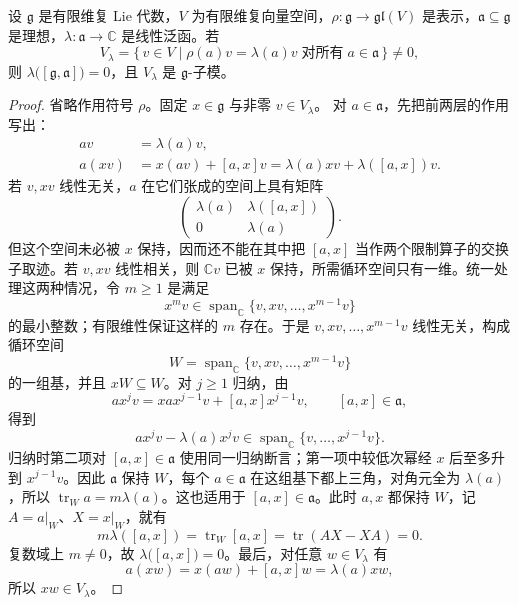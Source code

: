 \begin{lemma}[理想的特征空间]\label{b5:lem:ideal-weight-stable}
	设 \(\mathfrak g\) 是有限维复 Lie 代数，\(V\) 为有限维复向量空间，\(\rho:\mathfrak g\rightarrow\mathfrak{gl}(V)\) 是表示，\(\mathfrak a\subseteq\mathfrak g\) 是理想，\(\lambda:\mathfrak a\rightarrow\mathbb C\) 是线性泛函。若
	\[
		V_\lambda=\bigl\{\,v\in V\mid \rho(a)v=\lambda(a)v \;\text{对所有}\;a\in\mathfrak a\,\bigr\}\ne0,
	\]
	则 \(\lambda\bigl([\mathfrak g,\mathfrak a]\bigr)=0\)，且 \(V_\lambda\) 是 \(\mathfrak g\)-子模。
\end{lemma}
\begin{proof}
	省略作用符号 \(\rho\)。固定 \(x\in\mathfrak g\) 与非零 \(v\in V_\lambda\)。 对 \(a\in\mathfrak a\)，先把前两层的作用写出：
	\[
		\begin{aligned}
			av&=\lambda(a)v,\\
			a(xv)&=x(av)+[a,x]v =\lambda(a)xv+\lambda([a,x])v.
		\end{aligned}
	\]
	若 \(v,xv\) 线性无关，\(a\) 在它们张成的空间上具有矩阵
	\[
		\begin{pmatrix}
			\lambda(a)&\lambda([a,x])\\
			0&\lambda(a)
		\end{pmatrix}.
	\]
	但这个空间未必被 \(x\) 保持，因而还不能在其中把 \([a,x]\) 当作两个限制算子的交换子取迹。若 \(v,xv\) 线性相关，则 \(\mathbb Cv\) 已被 \(x\) 保持，所需循环空间只有一维。统一处理这两种情况，令 \(m\ge1\) 是满足
	\[
		x^mv\in\operatorname{span}_{\mathbb C}\{v,xv,\ldots,x^{m-1}v\}
	\]
	的最小整数；有限维性保证这样的 \(m\) 存在。于是 \(v,xv,\ldots,x^{m-1}v\) 线性无关，构成循环空间
	\[
		W=\operatorname{span}_{\mathbb C}\{v,xv,\ldots,x^{m-1}v\}
	\]
	的一组基，并且 \(xW\subseteq W\)。对 \(j\ge1\) 归纳，由
	\[
		a x^jv=x a x^{j-1}v+[a,x]x^{j-1}v,\qquad[a,x]\in\mathfrak a,
	\]
	得到
	\[
		a x^jv-\lambda(a)x^jv \in\operatorname{span}_{\mathbb C}\{v,\ldots,x^{j-1}v\}.
	\]
	归纳时第二项对 \([a,x]\in\mathfrak a\) 使用同一归纳断言；第一项中较低次幂经 \(x\) 后至多升到 \(x^{j-1}v\)。因此 \(\mathfrak a\) 保持 \(W\)，每个 \(a\in\mathfrak a\) 在这组基下都上三角，对角元全为 \(\lambda(a)\)，所以 \(\operatorname{tr}_W a=m\lambda(a)\)。这也适用于 \([a,x]\in\mathfrak a\)。此时 \(a,x\) 都保持 \(W\)，记 \(A=a|_W\)、\(X=x|_W\)，就有
	\[
		m\lambda([a,x])=\operatorname{tr}_W[a,x] =\operatorname{tr}(AX-XA)=0.
	\]
	复数域上 \(m\ne0\)，故 \(\lambda\bigl([a,x]\bigr)=0\)。最后，对任意 \(w\in V_\lambda\) 有
	\[
		a(xw)=x(aw)+[a,x]w=\lambda(a)xw,
	\]
	所以 \(xw\in V_\lambda\)。
\end{proof}


